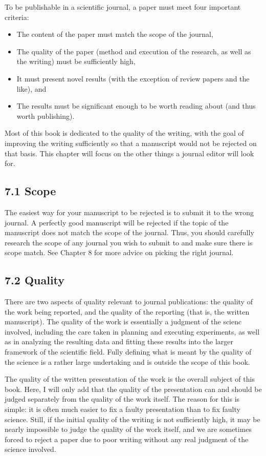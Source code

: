 To be publishable in a scientific journal, a paper must meet four important criteria:

\begin{itemize}
  \item The content of the paper must match the scope of the journal,
  \item The quality of the paper (method and execution of the research, as well as the writing) must be sufficiently high,
  \item It must present novel results (with the exception of review papers and the like), and
  \item The results must be significant enough to be worth reading about (and thus worth publishing).
\end{itemize}

Most of this book is dedicated to the quality of the writing, with the goal of improving the writing sufficiently so that a manuscript would not be rejected on that basis. This chapter will focus on the other things a journal editor will look for.

\subsection*{7.1 Scope}
The easiest way for your manuscript to be rejected is to submit it to the wrong journal. A perfectly good manuscript will be rejected if the topic of the manuscript does not match the scope of the journal. Thus, you should carefully research the scope of any journal you wish to submit to and make sure there is scope match. See Chapter 8 for more advice on picking the right journal.

\subsection*{7.2 Quality}
There are two aspects of quality relevant to journal publications: the quality of the work being reported, and the quality of the reporting (that is, the written manuscript). The quality of the work is essentially a judgment of the scienc involved, including the care taken in planning and executing experiments, as well as in analyzing the resulting data and fitting these results into the larger framework of the scientific field. Fully defining what is meant by the quality of the science is a rather large undertaking and is outside the scope of this book.

The quality of the written presentation of the work is the overall subject of this book. Here, I will only add that the quality of the presentation can and should be judged separately from the quality of the work itself. The reason for this is simple: it is often much easier to fix a faulty presentation than to fix faulty science. Still, if the initial quality of the writing is not sufficiently high, it may be nearly impossible to judge the quality of the work itself, and we are sometimes forced to reject a paper due to poor writing without any real judgment of the science involved.

